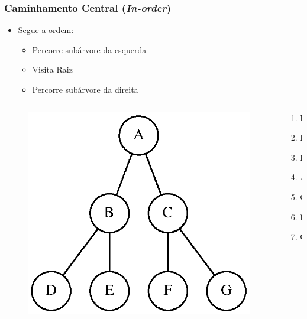 \documentclass[aspectratio=169]{beamer}
\begin{document}
\begin{frame}\frametitle{Caminhamento Central (\emph{In-order})	}
\begin{itemize}
	\item Segue a ordem:
	\begin{itemize}
		\item Percorre subárvore da esquerda
		\item Visita Raiz
		\item Percorre subárvore da direita
	\end{itemize}
\end{itemize}
\begin{columns}[T]
\begin{column}{0.7\linewidth}
\begin{figure}[h]
	\centering
	\includegraphics[height=0.4\paperheight]{imagens/arvore_binaria08.eps}
\end{figure}
\end{column}
\begin{column}{0.3\linewidth}
\pause
\begin{enumerate}
	\item D
	\item B
	\item E
	\item A
	\item C
	\item F
	\item G
\end{enumerate}
\end{column}
\end{columns}
\end{frame}
\end{document}
